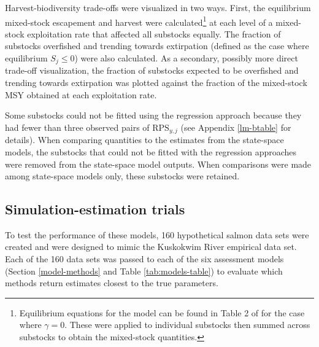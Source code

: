 \documentclass[12pt,]{book}
\let\rmarkdownfootnote\footnote%
\def\footnote{\protect\rmarkdownfootnote}
\theoremstyle{definition}
\theoremstyle{definition}
\theoremstyle{definition}
\theoremstyle{remark}
\begin{document}
Harvest-biodiversity trade-offs were visualized in two ways. First, the
equilibrium mixed-stock escapement and harvest were calculated\footnote{Equilibrium
  equations for the \citet{ricker-1954} model can be found in Table 2 of
  \citet{schnute-kronlund-2002} for the case where \(\gamma = 0\). These
  were applied to individual substocks then summed across substocks to
  obtain the mixed-stock quantities.} at each level of a mixed-stock
exploitation rate that affected all substocks equally. The fraction of
substocks overfished and trending towards extirpation (defined as the
case where equilibrium \(S_{j} \leq 0\)) were also calculated. As a
secondary, possibly more direct trade-off visualization, the fraction of
substocks expected to be overfished and trending towards extirpation was
plotted against the fraction of the mixed-stock MSY obtained at each
exploitation rate.

Some substocks could not be fitted using the regression approach because
they had fewer than three observed pairs of \(\text{RPS}_{y,j}\) (see
Appendix \ref{lm-btable} for details). When comparing quantities to the
estimates from the state-space models, the substocks that could not be
fitted with the regression approaches were removed from the state-space
model outputs. When comparisons were made among state-space models only,
these substocks were retained.

\subsection{Simulation-estimation
trials}\label{simulation-estimation-trials}

\noindent
To test the performance of these models, 160 hypothetical salmon data
sets were created and were designed to mimic the Kuskokwim River
empirical data set. Each of the 160 data sets was passed to each of the
six assessment models (Section \ref{model-methods} and Table
\ref{tab:models-table}) to evaluate which methods return estimates
closest to the true parameters.
\end{document}
